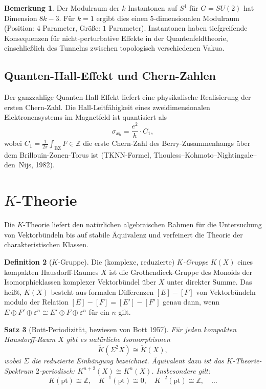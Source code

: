 \documentclass[12pt,a4paper]{amsart}
\newtheorem{theorem}{Satz}[section]
\theoremstyle{definition}
\newtheorem{definition}[theorem]{Definition}
\newtheorem{remark}[theorem]{Bemerkung}
\begin{document}
\begin{remark}
Der Modulraum der $k$ Instantonen auf $S^4$ für $G = SU(2)$ hat Dimension
$8k - 3$. Für $k=1$ ergibt dies einen $5$-dimensionalen Modulraum (Position:
$4$ Parameter, Größe: $1$ Parameter). Instantonen haben tiefgreifende
Konsequenzen für nicht-perturbative Effekte in der Quantenfeldtheorie,
einschließlich des Tunnelns zwischen topologisch verschiedenen Vakua.
\end{remark}

\subsection{Quanten-Hall-Effekt und Chern-Zahlen}

Der ganzzahlige Quanten-Hall-Effekt liefert eine physikalische Realisierung
der ersten Chern-Zahl. Die Hall-Leitfähigkeit eines zweidimensionalen
Elektronensystems im Magnetfeld ist quantisiert als
\[
  \sigma_{xy} = \frac{e^2}{h} \cdot C_1,
\]
wobei $C_1 = \frac{1}{2\pi} \int_{\mathrm{BZ}} F \in \mathbb{Z}$ die erste
Chern-Zahl des Berry-Zusammenhangs über dem Brillouin-Zonen-Torus ist
(TKNN-Formel, Thouless--Kohmoto--Nightingale--den~Nijs, 1982).

\section{$K$-Theorie}
\label{sec:ktheorie}

Die $K$-Theorie liefert den natürlichen algebraischen Rahmen für die Untersuchung
von Vektorbündeln bis auf stabile Äquivalenz und verfeinert die Theorie der
charakteristischen Klassen.

\begin{definition}[$K$-Gruppe]
Die (komplexe, reduzierte) \emph{$K$-Gruppe} $K(X)$ eines kompakten
Hausdorff-Raumes $X$ ist die Grothendieck-Gruppe des Monoids der
Isomorphieklassen komplexer Vektorbündel über $X$ unter direkter Summe. Das
heißt, $K(X)$ besteht aus formalen Differenzen $[E] - [F]$ von Vektorbündeln
modulo der Relation $[E] - [F] = [E'] - [F']$ genau dann, wenn
$E \oplus F' \oplus \varepsilon^n \cong E' \oplus F \oplus \varepsilon^n$
für ein $n$ gilt.
\end{definition}

\begin{theorem}[Bott-Periodizität, bewiesen von Bott 1957]
\label{thm:bott}
Für jeden kompakten Hausdorff-Raum $X$ gibt es natürliche Isomorphismen
\[
  \tilde{K}(\Sigma^2 X) \cong \tilde{K}(X),
\]
wobei $\Sigma$ die reduzierte Einhängung bezeichnet. Äquivalent dazu ist das
$K$-Theorie-Spektrum $2$-periodisch: $K^{n+2}(X) \cong K^n(X)$.
Insbesondere gilt:
\[
  K(\mathrm{pt}) \cong \mathbb{Z}, \quad K^{-1}(\mathrm{pt}) \cong 0,
  \quad K^{-2}(\mathrm{pt}) \cong \mathbb{Z}, \quad \ldots
\]
\end{theorem}
\end{document}
